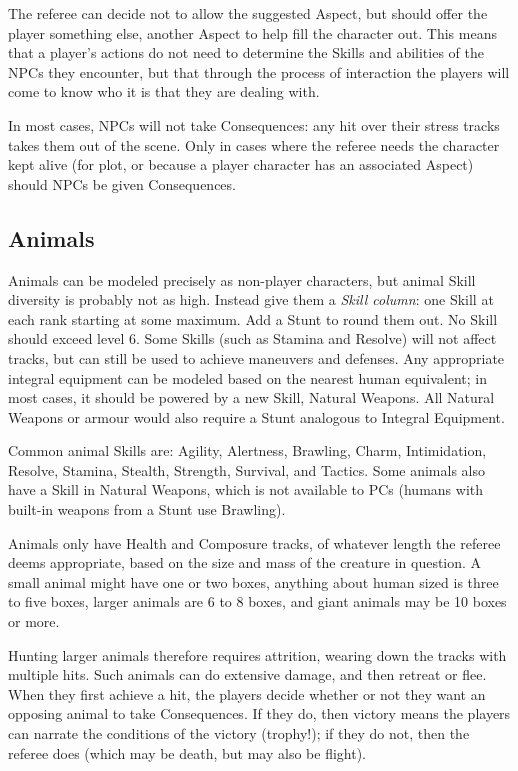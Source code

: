 The referee can decide not to allow the suggested Aspect, but should offer the player something else, another Aspect to help fill the character out.  This means that a player's actions do not need to determine the Skills and abilities of the NPCs they encounter, but that through the process of interaction the players will come to know who it is that they are dealing with.

In most cases, NPCs will not take Consequences: any hit over their stress tracks takes them out of the scene. Only in cases where the referee needs the character kept alive (for plot, or because a player character has an associated Aspect) should NPCs be given Consequences.

\subsection{Animals}\label{sec:Animals} %

Animals can be modeled precisely as non-player characters, but animal Skill diversity is probably not as high. Instead give them a \emph{Skill column}: one Skill at each rank starting at some maximum. Add a Stunt to round them out. No Skill should exceed level 6. Some Skills (such as Stamina and Resolve) will not affect tracks, but can still be used to achieve maneuvers and defenses. Any appropriate integral equipment can be modeled based on the nearest human equivalent; in most cases, it should be powered by a new Skill, Natural Weapons. All Natural Weapons or armour would also require a Stunt analogous to Integral Equipment.

Common animal Skills are: Agility, Alertness, Brawling, Charm, Intimidation, Resolve, Stamina, Stealth, Strength, Survival, and Tactics. Some animals also have a Skill in Natural Weapons, which is not available to PCs (humans with built-in weapons from a Stunt use Brawling).

Animals only have Health and Composure tracks, of whatever length the referee deems appropriate, based on the size and mass of the creature in question. A small animal might have one or two boxes, anything about human sized is three to five boxes, larger animals are 6 to 8 boxes, and giant animals may be 10 boxes or more.

Hunting larger animals therefore requires attrition, wearing down the tracks with multiple hits. Such animals can do extensive damage, and then retreat or flee. When they first achieve a hit, the players decide whether or not they want an opposing animal to take Consequences. If they do, then victory means the players can narrate the conditions of the victory (trophy!); if they do not, then the referee does (which may be death, but may also be flight).


